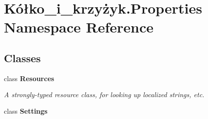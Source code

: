 \hypertarget{namespace_k_xC3_xB3_xC5_x82ko__i__krzy_xC5_xBCyk_1_1_properties}{}\section{Kółko\+\_\+i\+\_\+krzyżyk.\+Properties Namespace Reference}
\label{namespace_k_xC3_xB3_xC5_x82ko__i__krzy_xC5_xBCyk_1_1_properties}
\subsection*{Classes}
\begin{DoxyCompactItemize}
\item 
class {\bfseries Resources}
\begin{DoxyCompactList}\small\item\em A strongly-\/typed resource class, for looking up localized strings, etc. \end{DoxyCompactList}\item 
class {\bfseries Settings}
\end{DoxyCompactItemize}
